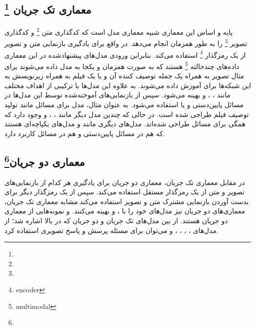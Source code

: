 \subsection[معماری تک جریان]{معماری تک جریان \footnote{}}
	پایه و اساس این معماری شبیه معماری مدل 
	\cite{devlin2018bert}
 است که کدگذاری متن
 \footnote{}
  و کدگذاری تصویر 
 \footnote{}
  را به طور همزمان انجام می‌دهد. در واقع برای یادگیری بازنمایی متن و تصویر از یک  رمزگذار
  \footnote{encoder}
   استفاده می‌کند. بنابراین ورودی مدل‌های پیشنهادشده در این معماری داده‌های چندحالته
  \footnote{multimodal}
   هستند که به صورت همزمان و یکجا به مدل داده می‌شوند برای مثال تصویر به همراه یک جمله توصیف کننده آن و یا یک فیلم به همراه زیرنویسش به این شبکه‌ها برای آموزش داده می‌شوند. به علاوه این مدل‌ها با ترکیبی از اهداف مختلف مانند 
   ،
   ،
   و 
   بهینه می‌شود. سپس از بازنمایی‌های آموخته‌شده توسط این مدل‌ها در مسائل پایین‌دستی 
   و یا 
   استفاده می‌شود. به عنوان مثال، مدل
	\cite{sun2019videobert}
  برای مسائل 
  مانند تولید توصیف فیلم طراحی شده است. در حالی که چندین مدل دیگر مانند
	\cite{alberti2019fusion}
  ،
	 \cite{li2020unicoder}
  ، 
	\cite{su2019vl}
  و
	\cite{chen2020uniter}
	وجود دارد که همگی برای مسائل 
    طراحی شده‌اند. مدل‌های دیگری مانند
    \cite{zhou2020unified}
  و
     \cite{li2020oscar}
  مدل‌های یکپاچه‌ای هستند که هم در مسائل پایین‌دستی 
   و هم در مسائل
   کاربرد دارد.

\subsection[معماری دو جریان]{معماری دو جریان\footnote{}}
در مقابل معماری تک جریان، معماری‌ دو جریان برای یادگیری  هر کدام از بازنمایی‌های تصویر و متن از یک رمزگذار مستقل استفاده می‌کند. سپس از یک رمزگذار دیگر برای بدست آوردن بازنمایی مشترک متن و تصویر استفاده می‌کند.مشابه معماری تک جریان، معماری‌های دو جریان نیز مدل‌های خود را با
	،
	و 
	بهینه می‌کنند. 
	\cite{lu2019vilbert}
	 و
	\cite{tan2019lxmert}
  نمونه‌هایی از معماری دو جریان هستند. از بین مدل‌های تک جریان و دو جریان که در بالا اشاره شد؛ از مدل‌های
  ،
  ،
  ،
  ،
  و
  می‌توان برای مسئله پرسش و پاسخ تصویری استفاده کرد.
   

